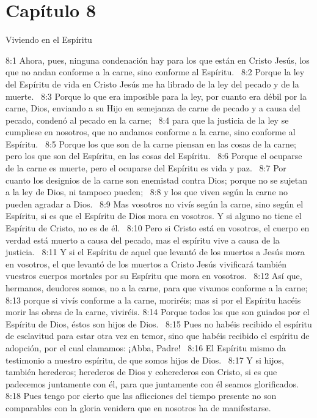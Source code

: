\section*{Capítulo 8}
Viviendo en el Espíritu  

8:1 Ahora, pues, ninguna condenación hay para los que están en Cristo Jesús, los que no andan conforme a la carne, sino conforme al Espíritu.  
8:2 Porque la ley del Espíritu de vida en Cristo Jesús me ha librado de la ley del pecado y de la muerte.  
8:3 Porque lo que era imposible para la ley, por cuanto era débil por la carne, Dios, enviando a su Hijo en semejanza de carne de pecado y a causa del pecado, condenó al pecado en la carne;  
8:4 para que la justicia de la ley se cumpliese en nosotros, que no andamos conforme a la carne, sino conforme al Espíritu.  
8:5 Porque los que son de la carne piensan en las cosas de la carne; pero los que son del Espíritu, en las cosas del Espíritu.  
8:6 Porque el ocuparse de la carne es muerte, pero el ocuparse del Espíritu es vida y paz.  
8:7 Por cuanto los designios de la carne son enemistad contra Dios; porque no se sujetan a la ley de Dios, ni tampoco pueden;  
8:8 y los que viven según la carne no pueden agradar a Dios.  
8:9 Mas vosotros no vivís según la carne, sino según el Espíritu, si es que el Espíritu de Dios mora en vosotros. Y si alguno no tiene el Espíritu de Cristo, no es de él.  
8:10 Pero si Cristo está en vosotros, el cuerpo en verdad está muerto a causa del pecado, mas el espíritu vive a causa de la justicia.  
8:11 Y si el Espíritu de aquel que levantó de los muertos a Jesús mora en vosotros, el que levantó de los muertos a Cristo Jesús vivificará también vuestros cuerpos mortales por su Espíritu que mora en vosotros.  
8:12 Así que, hermanos, deudores somos, no a la carne, para que vivamos conforme a la carne;  
8:13 porque si vivís conforme a la carne, moriréis; mas si por el Espíritu hacéis morir las obras de la carne, viviréis. 
8:14 Porque todos los que son guiados por el Espíritu de Dios, éstos son hijos de Dios.  
8:15 Pues no habéis recibido el espíritu de esclavitud para estar otra vez en temor, sino que habéis recibido el espíritu de adopción, por el cual clamamos: ¡Abba, Padre!  
8:16 El Espíritu mismo da testimonio a nuestro espíritu, de que somos hijos de Dios.  
8:17 Y si hijos, también herederos; herederos de Dios y coherederos con Cristo, si es que padecemos juntamente con él, para que juntamente con él seamos glorificados.  
8:18 Pues tengo por cierto que las aflicciones del tiempo presente no son comparables con la gloria venidera que en nosotros ha de manifestarse.  
